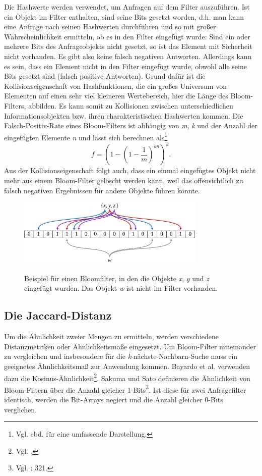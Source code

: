 Die Hashwerte werden verwendet, um Anfragen auf dem Filter auszuführen. Ist ein Objekt im Filter enthalten, sind seine Bits gesetzt worden, d.h. man kann eine Anfrage nach seinen Hashwerten durchführen und so mit großer Wahrscheinlichkeit ermitteln, ob es in den Filter eingefügt wurde: Sind ein oder mehrere Bits des Anfrageobjekts nicht gesetzt, so ist das Element mit Sicherheit nicht vorhanden. Es gibt also keine falsch negativen Antworten. Allerdings kann es sein, dass ein Element nicht in den Filter eingefügt wurde, obwohl alle seine Bits gesetzt sind (falsch positive Antworten). Grund dafür ist die Kollisionseigenschaft von Hashfunktionen, die ein großes Universum von Elementen auf einen sehr viel kleineren Wertebereich, hier die Länge des Bloom-Filters, abbilden. Es kann somit zu Kollisionen zwischen unterschiedlichen Informationsobjekten bzw. ihren charakteristischen Hashwerten kommen. Die Falsch-Positiv-Rate eines Bloom-Filters ist abhängig von \textit{m}, \textit{k} und der Anzahl der eingefügten Elemente \textit{n} und lässt sich berechnen als\footnote{Vgl. ebd. für eine umfassende Darstellung.}
\[f = \left(1 - \left(1-\frac{1}{m}\right)^{kn}\right)^k.\]
Aus der Kollisionseigenschaft folgt auch, dass ein einmal eingefügtes Objekt nicht mehr aus einem Bloom-Filter gelöscht werden kann, weil das offensichtlich zu falsch negativen Ergebnissen für andere Objekte führen könnte. 
\begin{figure}[hpbt]
  \centering
  \includegraphics[width=0.8\textwidth]{pictures/1280px-Bloom_filter.png}\\
  \caption[Bloomfilter-Beispiel, Bildnachweis: \url{https://commons.wikimedia.org/wiki/File:Bloom_filter.svg}.]{Beispiel für einen Bloomfilter, in den die Objekte \textit{x}, \textit{y} und \textit{z} eingefügt wurden. Das Objekt \textit{w} ist nicht im Filter vorhanden.}\label{fig:pic0}
\end{figure}
\subsection{Die Jaccard-Distanz}\label{jacc}
Um die Ähnlichkeit zweier Mengen zu ermitteln, werden verschiedene Distanzmetriken oder Ähnlichkeitsmaße eingesetzt. Um Bloom-Filter miteinander zu vergleichen und insbesondere für die \textit{k}-nächste-Nachbarn-Suche muss ein geeignetes Ähnlichkeitsmaß zur Anwendung kommen. Bayardo et al. verwenden dazu die Kosinus-Ähnlichkeit\footnote{Vgl. \cite{Bayardo2007}.}. Sakuma und Sato definieren die Ähnlichkeit von Bloom-Filtern über die Anzahl gleicher 1-Bits\footnote{Vgl. \cite{Sakuma2011}: 321.}. Ist diese für zwei Anfragefilter identisch, werden die Bit-Arrays negiert und die Anzahl gleicher 0-Bits verglichen. 

